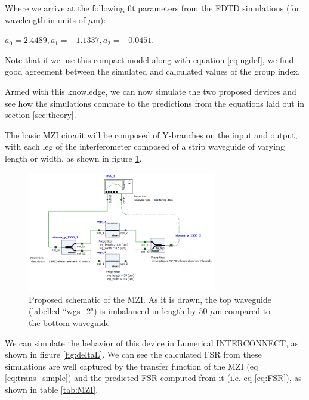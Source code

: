 \documentclass[journal]{IEEEtran}
\begin{document}
Where we arrive at the following fit parameters from the FDTD simulations (for wavelength in units of $\mu$m):

$ a_0 = 2.4489, a_1 = -1.1337, a_2 = -0.0451 $.

Note that if we use this compact model along with equation \ref{eq:ngdef}, we find good agreement between the simulated and calculated values of the group index.

Armed with this knowledge, we can now simulate the two proposed devices and see how the simulations compare to the predictions from the equations laid out in section \ref{sec:theory}.

The basic MZI circuit will be composed of Y-branches on the input and output, with each leg of the interferometer composed of a strip waveguide of varying length or width, as shown in figure \ref{fig:schematic}.


\begin{figure}[t!]
  \centering
  \includegraphics[width = 3.25in]{fig/MZI_schematic.png}
  \caption{Proposed schematic of the MZI. As it is drawn, the top waveguide (labelled ``wgs\_2") is imbalanced in length by 50 $\mu$m compared to the bottom waveguide}
  \label{fig:schematic}
\end{figure}

We can simulate the behavior of this device in Lumerical INTERCONNECT, as shown in figure \ref{fig:deltaL}. We can see the calculated FSR from these simulations are well captured by the transfer function of the MZI (eq \ref{eq:trans_simple}) and the predicted FSR computed from it (i.e. eq \ref{eq:FSR}), as shown in table \ref{tab:MZI}.
\end{document}
